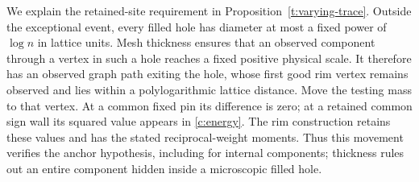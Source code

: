 We explain the retained-site requirement in
Proposition~\ref{t:varying-trace}. Outside the exceptional event, every
filled hole has diameter at most a fixed power of $\log n$ in lattice
units. Mesh thickness ensures that an observed component through a
vertex in such a hole reaches a fixed positive physical scale. It
therefore has an observed graph path exiting the hole, whose first
good rim vertex remains observed and lies within a polylogarithmic
lattice distance. Move the testing mass to that vertex. At a common
fixed pin its difference is zero; at a retained common sign wall its
squared value appears in \eqref{c:energy}. The rim construction retains
these values and has the stated reciprocal-weight moments. Thus this
movement verifies the anchor hypothesis, including for internal
components; thickness rules out an entire component hidden inside a
microscopic filled hole.

